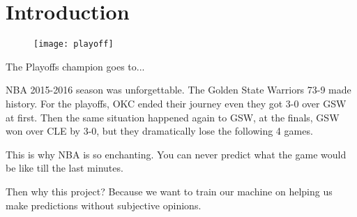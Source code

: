 \section{Introduction}


\begin{figure}[h]
\centering
\texttt{[image: playoff]}
\end{figure}

\par The Playoffs champion goes to...

NBA 2015-2016 season was unforgettable. The Golden State Warriors 73-9 made history.
For the playoffs, OKC ended their journey even they got 3-0 over GSW at first.
Then the same situation happened again to GSW, at the finals, GSW won over CLE
by 3-0, but they dramatically lose the following 4 games.

This is why NBA is so enchanting. You can never predict what the game would be
like till the last minutes.

Then why this project? Because we want to train our machine on helping us make 
predictions without subjective opinions.



